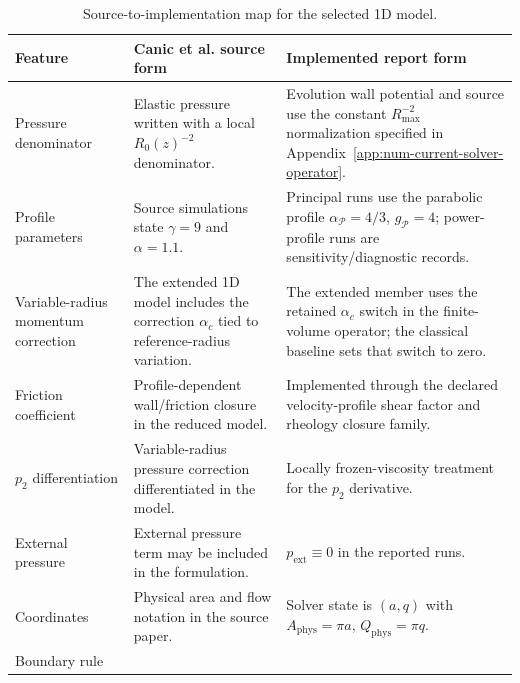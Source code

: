 \begin{table}[!htb]
    \centering
    \scriptsize
    \caption{Source-to-implementation map for the selected 1D model.}
    \label{tab:source-to-implementation-model}
    \begin{tabularx}{\textwidth}{@{}
        >{\raggedright\arraybackslash}p{}
        >{\raggedright\arraybackslash}p{}
        >{\raggedright\arraybackslash}X@{}}
        \toprule
        \textbf{Feature} & \textbf{Canic et al. source form} & \textbf{Implemented report form} \\
        \midrule
        Pressure denominator
            & Elastic pressure written with a local $R_0(z)^{-2}$ denominator.
            & Evolution wall potential and source use the constant
            $R_{\max}^{-2}$ normalization specified in
            Appendix~\ref{app:num-current-solver-operator}. \\
        Profile parameters
            & Source simulations state $\gamma=9$ and $\alpha=1.1$.
            & Principal runs use the parabolic profile
            $\alpha_{\mathcal P}=4/3$, $g_{\mathcal P}=4$; power-profile runs
            are sensitivity/diagnostic records. \\
        Variable-radius momentum correction
            & The extended 1D model includes the correction $\alpha_c$ tied to
            reference-radius variation.
            & The extended member uses the retained $\alpha_c$ switch in the
            finite-volume operator; the classical baseline sets that switch to
            zero. \\
        Friction coefficient
            & Profile-dependent wall/friction closure in the reduced model.
            & Implemented through the declared velocity-profile shear factor
            and rheology closure family. \\
        $p_2$ differentiation
            & Variable-radius pressure correction differentiated in the model.
            & Locally frozen-viscosity treatment for the $p_2$ derivative. \\
        External pressure
            & External pressure term may be included in the formulation.
            & $p_{\mathrm{ext}}\equiv0$ in the reported runs. \\
        Coordinates
            & Physical area and flow notation in the source paper.
            & Solver state is $(a,q)$ with
            $A_{\mathrm{phys}}=\pi a$, $Q_{\mathrm{phys}}=\pi q$. \\
        Boundary rule

\end{tabularx}
\end{table}
